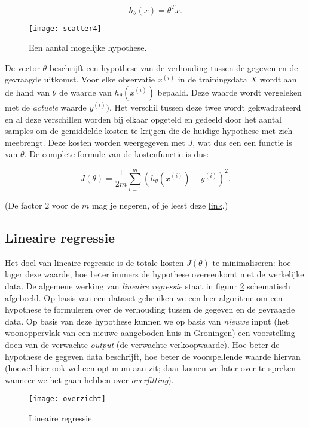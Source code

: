 \[
h_\theta(x) = \theta^Tx.
\]

\begin{figure}[h]
\centering
\texttt{[image: scatter4]}
\caption{Een aantal mogelijke hypothese.\label{img:scatter4}}
\end{figure}

De vector $\theta$ beschrijft een hypothese van de verhouding tussen de gegeven en de gevraagde uitkomst. Voor elke observatie $x^{(i)}$ in de trainingsdata $X$ wordt aan de hand van $\theta$ de waarde van $h_\theta(x^{(i)})$ bepaald. Deze waarde wordt vergeleken met de \textit{actuele} waarde $y^{(i)})$. Het verschil tussen deze twee wordt gekwadrateerd en al deze verschillen worden bij elkaar opgeteld en gedeeld door het aantal samples om de gemiddelde kosten te krijgen die de huidige hypothese met zich meebrengt. Deze kosten worden weergegeven met $J$, wat dus een een functie is van $\theta$. De complete formule van de kostenfunctie is dus:

\[
J(\theta) = \frac{1}{2m}\sum_{i=1}^m(h_\theta(x^{(i)})-y^{(i)})^2.
\]

(De factor $2$ voor de $m$ mag je negeren, of je leest deze \href{https://math.stackexchange.com/questions/884887/why-divide-by-2m}{link}.)

\subsection{Lineaire regressie}

Het doel van lineaire regressie is de totale kosten $J(\theta)$ te minimaliseren: hoe lager deze waarde, hoe beter immers de hypothese overeenkomt met de werkelijke data. De algemene werking van \textit{lineaire regressie} staat in figuur \ref{img:overzicht} schematisch afgebeeld. Op basis van een dataset gebruiken we een leer-algoritme om een hypothese te formuleren over de verhouding tussen de gegeven en de gevraagde data. Op basis van deze hypothese kunnen we op basis van \textit{nieuwe} input (het woonoppervlak van een nieuwe aangeboden huis in Groningen) een voorstelling doen van de verwachte \textit{output} (de verwachte verkoopwaarde). Hoe beter de hypothese de gegeven data beschrijft, hoe beter de voorspellende waarde hiervan (hoewel hier ook wel een optimum aan zit; daar komen we later over te spreken wanneer we het gaan hebben over \textit{overfitting}).

\begin{figure}[h]
\centering
\texttt{[image: overzicht]}
\caption{Lineaire regressie.\label{img:overzicht}}
\end{figure}

